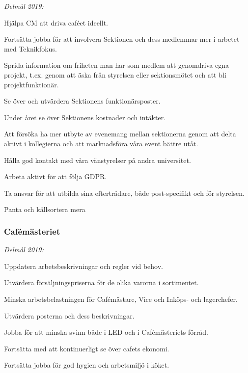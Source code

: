 \documentclass[../_main/handlingar.tex]{subfiles}
\begin{document}
\emph{Delmål 2019:}
\begin{dashlist}
    \item Hjälpa CM att driva caféet ideellt. 
    \item Fortsätta jobba för att involvera Sektionen och dess medlemmar mer i arbetet med Teknikfokus. 
    \item Sprida information om friheten man har som medlem att genomdriva egna projekt, t.ex. genom att äska från styrelsen eller sektionsmötet och att bli projektfunktionär. 
    \item Se över och utvärdera Sektionens funktionärsposter. 
    \item Under året se över Sektionens kostnader och intäkter. 
    \item Att försöka ha mer utbyte av evenemang mellan sektionerna genom att delta aktivt i kollegierna och att marknadsföra våra event bättre utåt. 
    \item Hålla god kontakt med våra vänstyrelser på andra universitet.
    \item Arbeta aktivt för att följa GDPR.
    \item Ta ansvar för att utbilda sina efterträdare, både post-specifikt och för styrelsen.
    \item Panta och källsortera mera \scalebox{0.5}{\recycle}
\end{dashlist}

\subsubsection*{Cafémästeriet}

\emph{Delmål 2019:}
\begin{dashlist}
    \item Uppdatera arbetsbeskrivningar och regler vid behov. 
    \item Utvärdera försäljningspriserna för de olika varorna i sortimentet. 
    \item Minska arbetsbelastningen för Cafémästare, Vice och Inköps- och lagerchefer. 
    \item Utvärdera posterna och dess beskrivningar. 
    \item Jobba för att minska svinn både i LED och i Cafémästeriets förråd.
    \item Fortsätta med att kontinuerligt se över cafets ekonomi.
    \item Fortsätta jobba för god hygien och arbetsmiljö i köket.   
\end{dashlist}
\end{document}
